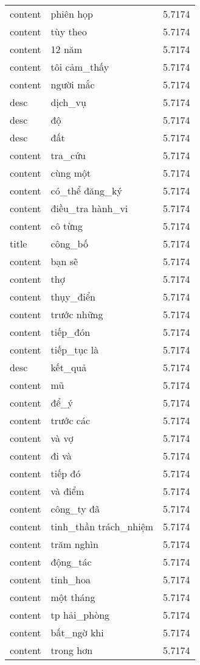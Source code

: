 \documentclass{article}
\begin{document}
\begin{tabular}{lll}
content & phiên họp & 5.7174\\
content & tùy theo & 5.7174\\
content & 12 năm & 5.7174\\
content & tôi cảm\_thấy & 5.7174\\
content & người mắc & 5.7174\\
desc & dịch\_vụ & 5.7174\\
desc & độ & 5.7174\\
desc & đất & 5.7174\\
content & tra\_cứu & 5.7174\\
content & cùng một & 5.7174\\
content & có\_thể đăng\_ký & 5.7174\\
content & điều\_tra hành\_vi & 5.7174\\
content & cô từng & 5.7174\\
title & công\_bố & 5.7174\\
content & bạn sẽ & 5.7174\\
content & thợ & 5.7174\\
content & thụy\_điển & 5.7174\\
content & trước những & 5.7174\\
content & tiếp\_đón & 5.7174\\
content & tiếp\_tục là & 5.7174\\
desc & kết\_quả & 5.7174\\
content & mũ & 5.7174\\
content & để\_ý & 5.7174\\
content & trước các & 5.7174\\
content & và vợ & 5.7174\\
content & đi và & 5.7174\\
content & tiếp đó & 5.7174\\
content & và điểm & 5.7174\\
content & công\_ty đã & 5.7174\\
content & tinh\_thần trách\_nhiệm & 5.7174\\
content & trăm nghìn & 5.7174\\
content & động\_tác & 5.7174\\
content & tinh\_hoa & 5.7174\\
content & một tháng & 5.7174\\
content & tp hải\_phòng & 5.7174\\
content & bất\_ngờ khi & 5.7174\\
content & trong hơn & 5.7174\\

\end{tabular}
\end{document}
